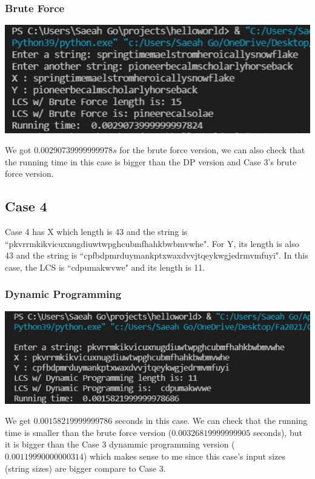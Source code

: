 \documentclass{article}
\begin{document}
\subsubsection{Brute Force}
\begin{center}
\includegraphics[scale = 0.7]{case3 BF.png} \\
\end{center}
We got $0.00290739999999978s$ for the brute force version, we can also check that the running time in this case is bigger than the DP version and Case 3's brute force version. 

\subsection{\textbf{Case 4}} 
Case 4 has X which length is 43 and the string is ``pkvrrmkikvicuxnugdiuwtwpghcubmfhahkbwbmvwhe". For Y, its length is also 43 and the string is ``cpfbdpmrduymankptxwaxdvvjtqeykwgjedrmvmfuyi". In this case, the LCS is ``cdpumakwvwe" and its length is 11.
\subsubsection{Dynamic Programming}
\begin{center}
\includegraphics[scale = 0.7]{case4 DP.png} \\
\end{center}
We get $0.00158219999999786$ seconds in this case. We can check that the running time is smaller than the brute force version ($0.00326819999999905$ seconds), but it is bigger than the Case 3 dynammic programming version ($0.00119990000000314$) which makes sense to me since this case's input sizes (string sizes) are bigger compare to Case 3.
\end{document}
